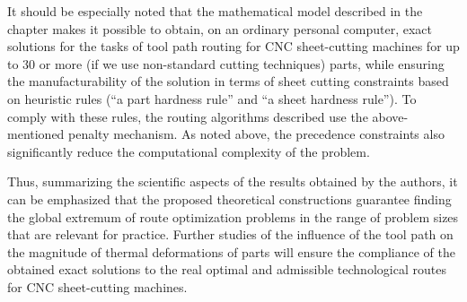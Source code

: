 \documentclass[numbers,sort&compress]{IntechOpen-Book}%
\begin{document}
\begin{figure}
  \centering
\end{figure}


It should be especially noted
that the mathematical model described in the chapter
makes it possible to obtain,
on an ordinary personal computer,
exact solutions for the tasks of tool path routing for CNC sheet-cutting machines for up to 30 or more (if we use non-standard cutting techniques) parts, while ensuring the manufacturability of the solution in terms of sheet cutting constraints based on heuristic rules (``a part hardness rule'' and ``a sheet hardness rule''). To comply with these rules, the routing algorithms described use the above-mentioned penalty mechanism. As noted above, the precedence constraints also significantly reduce the computational complexity of the problem.

Thus, summarizing the scientific aspects of the results obtained by the authors,
it can be emphasized that the proposed
theoretical constructions guarantee finding the global extremum of route optimization problems
in the range of problem sizes that are relevant for practice.
Further studies of the influence of the tool path on
the magnitude of thermal deformations of parts will ensure the compliance of the obtained exact solutions
to the real optimal and admissible technological routes for CNC sheet-cutting machines.
\end{document}
